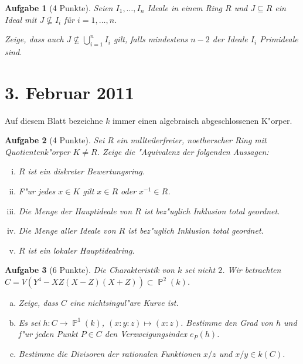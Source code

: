 \documentclass[a4paper, 12pt, numbers=noendperiod, chapterprefix=true]{scrbook}
\theoremstyle{break}
\newtheorem{Aufg}{Aufgabe}
\theoremstyle{nonumberbreak}
\theoremstyle{nonumberplain}
\newcommand{\A}{\mathbb{A}}
\DeclareMathOperator{\Projective}{\mathbb{P}} %
\begin{document}
\begin{Aufg}[4 Punkte]
Seien $I_1,\ldots, I_n$ Ideale in einem Ring $R$ und $J \subseteq R$ ein Ideal mit $J \nsubseteq I_i$ für $i=1,\ldots,n$. 

Zeige, dass auch $J \nsubseteq\bigcup_{i=1}^n I_i$ gilt, falls mindestens $n-2$ der Ideale $I_i$ Primideale sind.
\end{Aufg}

\newpage
\section{3. Februar 2011}
\setcounter{Aufg}{0}
\setcounter{Loes}{2}

Auf diesem Blatt bezeichne $k$ immer einen algebraisch abgeschlossenen K"orper.

\begin{Aufg}[4 Punkte]
Sei $R$ ein nullteilerfreier, noetherscher Ring mit Quotientenk"orper $K \ne R$. Zeige die "Aquivalenz der folgenden Aussagen:
\begin{enumerate}[i)]
	\item $R$ ist ein diskreter Bewertungsring.
	\item F"ur jedes $x \in K$ gilt $x \in R$ oder $x^{-1} \in R$.
	\item Die Menge der Hauptideale von $R$ ist bez"uglich Inklusion total geordnet.
	\item Die Menge aller Ideale von $R$ ist bez"uglich Inklusion total geordnet.
	\item $R$ ist ein lokaler Hauptidealring.
\end{enumerate}\end{Aufg}

\begin{Aufg}[6 Punkte]
Die Charakteristik von $k$ sei nicht $2$. Wir betrachten $C = V(Y^4 - XZ(X-Z)(X+Z))\subset \Projective^2(k)$.
\begin{enumerate}[a)]
	\item Zeige, dass $C$ eine nichtsingul"are Kurve ist.
	\item Es sei $h:C\to \Projective^1(k)$, $(x:y:z) \mapsto (x:z)$. Bestimme den Grad von $h$ und f"ur jeden Punkt $P\in C$ den Verzweigungsindex $e_P(h)$.
	\item Bestimme die Divisoren der rationalen Funktionen $x/z$ und $x/y\in k(C)$.
\end{enumerate}\end{Aufg}
\end{document}
